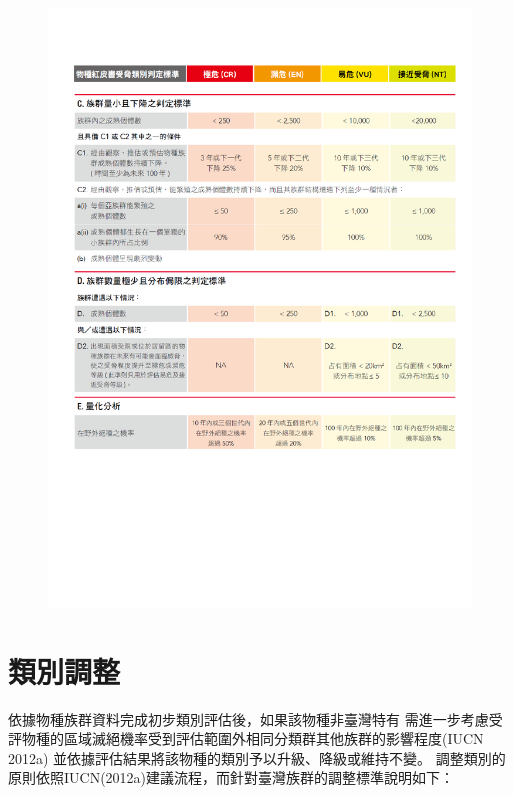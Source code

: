 \begin{figure}[!ht]
\includegraphics[scale=0.9]{iucn_standards2.pdf}
\end{figure}
\clearpage
\section{類別調整}
\begin{multicols}{2}
依據物種族群資料完成初步類別評估後，如果該物種非臺灣特有
需進一步考慮受評物種的區域滅絕機率受到評估範圍外相同分類群其他族群的影響程度(IUCN 2012a)
並依據評估結果將該物種的類別予以升級、降級或維持不變。
調整類別的原則依照IUCN(2012a)建議流程，而針對臺灣族群的調整標準說明如下：
\end{multicols}

